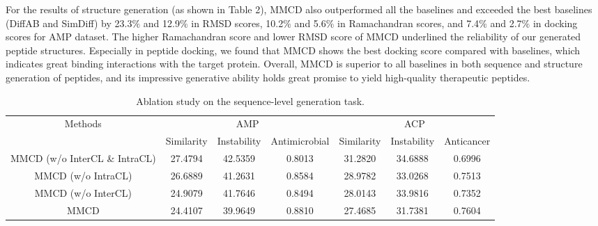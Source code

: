\documentclass[letterpaper]{article} %
\begin{document}
For the results of structure generation (as shown in Table 2), MMCD also outperformed all the baselines and exceeded the best baselines (DiffAB and SimDiff) by 23.3$\%$ and 12.9$\%$ in RMSD scores, 10.2$\%$ and 5.6$\%$ in Ramachandran scores, and 7.4$\%$ and 2.7$\%$ in docking scores for AMP dataset. The higher Ramachandran score and lower RMSD score of MMCD underlined the reliability of our generated peptide structures. Especially in peptide docking, we found that MMCD shows the best docking score compared with baselines, which indicates great binding interactions with the target protein. Overall, MMCD is superior to all baselines in both sequence and structure generation of peptides, and its impressive generative ability holds great promise to yield high-quality therapeutic peptides.

\begin{table}[ht]
\centering
\setlength{\tabcolsep}{6pt}
\begin{tabular}{ccccccc}
\hline
\multirow{2}{*}{Methods} & \multicolumn{3}{c}{AMP}                     & \multicolumn{3}{c}{ACP}                  \\ \cmidrule(r){2-4} \cmidrule(r){5-7}
                         & Similarity & Instability & Antimicrobial & Similarity & Instability & Anticancer \\ \hline
MMCD (w/o InterCL \& IntraCL)  & 27.4794     & 42.5359      & 0.8013         & 31.2820     & 34.6888      & 0.6996      \\
MMCD (w/o IntraCL)             & 26.6889     & 41.2631      & 0.8584         & 28.9782     & 33.0268      & 0.7513      \\
MMCD (w/o InterCL)             & 24.9079     & 41.7646      & 0.8494         & 28.0143     & 33.9816      & 0.7352      \\
MMCD                           & 24.4107     & 39.9649      & 0.8810         & 27.4685     & 31.7381      & 0.7604      \\ \hline
\end{tabular}
\caption{Ablation study on the sequence-level generation task.}
\end{table}
\end{document}
